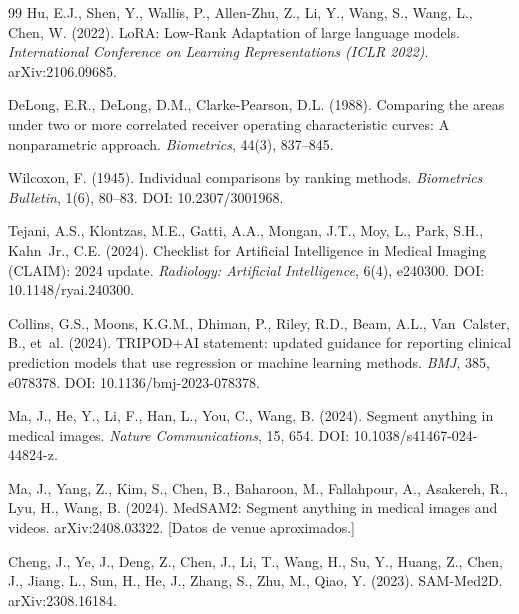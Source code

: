 \begin{thebibliography}{99}
Hu, E.J., Shen, Y., Wallis, P., Allen-Zhu, Z., Li, Y., Wang, S., Wang, L., Chen, W. (2022). LoRA: Low-Rank Adaptation of large language models. \emph{International Conference on Learning Representations (ICLR 2022)}. arXiv:2106.09685.

DeLong, E.R., DeLong, D.M., Clarke-Pearson, D.L. (1988). Comparing the areas under two or more correlated receiver operating characteristic curves: A nonparametric approach. \emph{Biometrics}, 44(3), 837--845.

Wilcoxon, F. (1945). Individual comparisons by ranking methods. \emph{Biometrics Bulletin}, 1(6), 80--83. DOI: 10.2307/3001968.

Tejani, A.S., Klontzas, M.E., Gatti, A.A., Mongan, J.T., Moy, L., Park, S.H., Kahn~Jr., C.E. (2024). Checklist for Artificial Intelligence in Medical Imaging (CLAIM): 2024 update. \emph{Radiology: Artificial Intelligence}, 6(4), e240300. DOI: 10.1148/ryai.240300.

Collins, G.S., Moons, K.G.M., Dhiman, P., Riley, R.D., Beam, A.L., Van~Calster, B., et~al. (2024). TRIPOD+AI statement: updated guidance for reporting clinical prediction models that use regression or machine learning methods. \emph{BMJ}, 385, e078378. DOI: 10.1136/bmj-2023-078378.

Ma, J., He, Y., Li, F., Han, L., You, C., Wang, B. (2024). Segment anything in medical images. \emph{Nature Communications}, 15, 654. DOI: 10.1038/s41467-024-44824-z.

Ma, J., Yang, Z., Kim, S., Chen, B., Baharoon, M., Fallahpour, A., Asakereh, R., Lyu, H., Wang, B. (2024). MedSAM2: Segment anything in medical images and videos. arXiv:2408.03322. [Datos de venue aproximados.]

Cheng, J., Ye, J., Deng, Z., Chen, J., Li, T., Wang, H., Su, Y., Huang, Z., Chen, J., Jiang, L., Sun, H., He, J., Zhang, S., Zhu, M., Qiao, Y. (2023). SAM-Med2D. arXiv:2308.16184.

\end{thebibliography}
